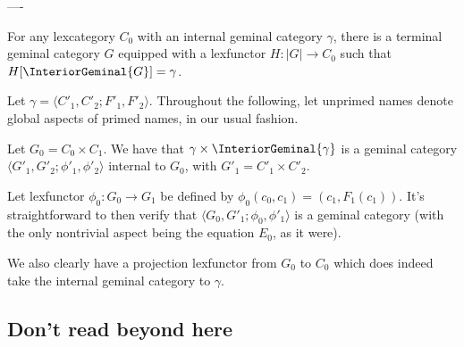 \closeDetails

----


\begin{construction}
For any lexcategory $C_0$ with an internal geminal category $\gamma$, there is a terminal geminal category $G$ equipped with a lexfunctor $H : |G| \to C_0$ such that $H[\InteriorGeminal{G}] = \gamma$.
\end{construction}
\openDetails
Let $\gamma = \langle C'_1, C'_2; F'_1, F'_2 \rangle$. Throughout the following, let unprimed names denote global aspects of primed names, in our usual fashion.

Let $G_0 = C_0 \times C_1$. We have that $\gamma \times \InteriorGeminal{\gamma}$ is a geminal category $\langle G'_1, G'_2; \phi'_1, \phi'_2 \rangle$ internal to $G_0$, with $G'_1 = C'_1 \times C'_2$. 

Let lexfunctor $\phi_0 : G_0 \to G_1$ be defined by $\phi_0(c_0, c_1) = (c_1, F_1(c_1))$. It's straightforward to then verify that $\langle G_0, G'_1; \phi_0, \phi'_1 \rangle$ is a geminal category (with the only nontrivial aspect being the equation $E_0$, as it were).

We also clearly have a projection lexfunctor from $G_0$ to $C_0$ which does indeed take the internal geminal category to $\gamma$.

\closeDetails


\subsection{Don't read beyond here}

